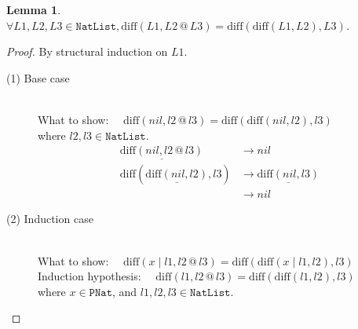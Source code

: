 \documentclass[12pt, a4paper]{article}
\newtheorem{lemma}[theorem]{Lemma}
\newcommand{\rel}[1]{\mathrel{#1}}
\newcommand{\rmx}[1]{\mathrm{#1}}
\newcommand{\larrow}{\longrightarrow}
\newcommand{\under}{\underline}
\begin{document}
\begin{lemma}
\label{lm1}
$\forall L1, L2, L3 \in \mathtt{NatList}, \rmx{diff}(L1, L2 \rel{@} L3) = \rmx{diff}(\rmx{diff}(L1, L2), L3)$.
\end{lemma}
\begin{proof}
By structural induction on $L1$.

\begin{description}

\item[(1) Base case]~\\
\noindent
What to show: $\quad \rmx{diff}(nil, l2 \rel{@} l3) = \rmx{diff}(\rmx{diff}(nil, l2), l3)$ \\
where $l2, l3 \in \mathtt{NatList}$.
\begin{align*}
\under{\rmx{diff}(nil, l2 \rel{@} l3)}
	&\larrow nil \tag{by diff1} \\
\rmx{diff}(\under{\rmx{diff}(nil, l2)}, l3)
	&\larrow \under{\rmx{diff}(nil, l3)} \tag{by diff1} \\
	&\larrow nil \tag{by diff1}
\end{align*}

\item[(2) Induction case]~\\
What to show: $\quad \rmx{diff}(x \rel{|} l1, l2 \rel{@} l3) = \rmx{diff}(\rmx{diff}(x \rel{|} l1, l2), l3)$ \\
Induction hypothesis: $\quad \rmx{diff}(l1, l2 \rel{@} l3) = \rmx{diff}(\rmx{diff}(l1, l2), l3)$  \\
where $x\in \mathtt{PNat}$, and $l1, l2, l3 \in \mathtt{NatList}$.


\end{description}
\end{proof}
\end{document}
